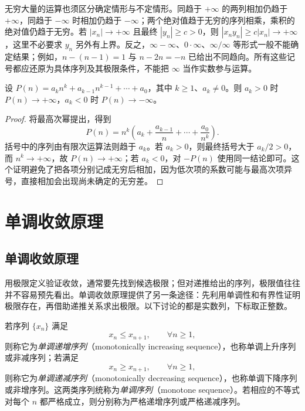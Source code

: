 无穷大量的运算也须区分确定情形与不定情形。同趋于 $+\infty$ 的两列相加仍趋于 $+\infty$，同趋于 $-\infty$ 时相加仍趋于 $-\infty$；两个绝对值趋于无穷的序列相乘，乘积的绝对值仍趋于无穷。若 $|x_n|\to+\infty$ 且最终 $|y_n|\geq c>0$，则 $|x_ny_n|\geq c|x_n|\to+\infty$，这里不必要求 $y_n$ 另外有上界。反之，$\infty-\infty$、$0\cdot\infty$、$\infty/\infty$ 等形式一般不能确定结果；例如，$n-(n-1)=1$ 与 $n-2n=-n$ 已给出不同趋向。所有这些记号都应还原为具体序列及其极限条件，不能把 $\infty$ 当作实数参与运算。

\begin{proposition}[多项式序列由最高次项决定无穷趋向]
\label{prop:polynomial-sequence-leading-term-infinity}
设 $P(n)=a_kn^k+a_{k-1}n^{k-1}+\cdots+a_0$，其中 $k\geq1$、$a_k\neq0$。则 $a_k>0$ 时 $P(n)\to+\infty$，$a_k<0$ 时 $P(n)\to-\infty$。
\end{proposition}

\begin{proof}
将最高次幂提出，得到
\[
    P(n)=n^k\left(a_k+\frac{a_{k-1}}n+\cdots+\frac{a_0}{n^k}\right).
\]
括号中的序列由有限次运算法则趋于 $a_k$。若 $a_k>0$，则最终括号大于 $a_k/2>0$，而 $n^k\to+\infty$，故 $P(n)\to+\infty$；若 $a_k<0$，对 $-P(n)$ 使用同一结论即可。这个证明避免了把各项分别记成无穷后相加，因为低次项的系数可能与最高次项异号，直接相加会出现尚未确定的无穷差。
\end{proof}

\section{单调收敛原理}
\label{sec:monotone-convergence}

\subsection{单调收敛原理}
\label{subsec:monotone-convergence-principle}

用极限定义验证收敛，通常要先找到候选极限；但对递推给出的序列，极限值往往并不容易预先看出。单调收敛原理提供了另一条途径：先利用单调性和有界性证明极限存在，再借助递推关系求出极限。以下讨论的都是实数列，下标取正整数。

\begin{definition}
\label{def:monotone-sequences}
若序列 $\{x_n\}$ 满足
\[
    x_n\leq x_{n+1},\qquad \forall n\geq1,
\]
则称它为\emph{单调递增序列}（monotonically increasing sequence），也称单调上升序列或非减序列；若满足
\[
    x_n\geq x_{n+1},\qquad \forall n\geq1,
\]
则称它为\emph{单调递减序列}（monotonically decreasing sequence），也称单调下降序列或非增序列。这两类序列统称为\emph{单调序列}（monotone sequence）。若相应的不等式对每个 $n$ 都严格成立，则分别称为严格递增序列或严格递减序列。
\end{definition}

